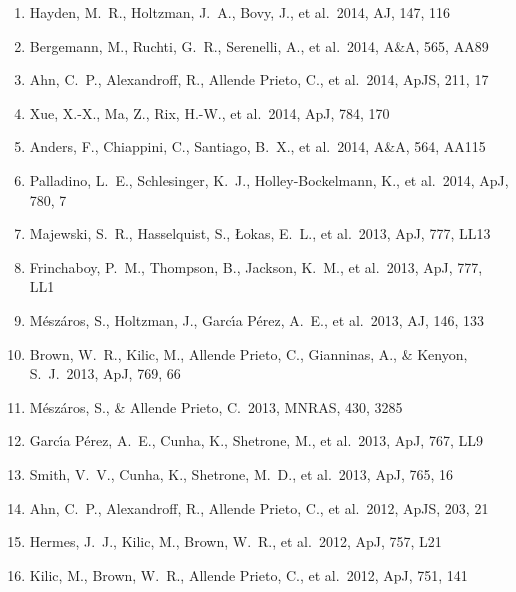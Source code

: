 \documentclass[12pt]{article}
\begin{document}
\begin{enumerate}
\item Hayden, M.~R., Holtzman, 
J.~A., Bovy, J., et al.\ 2014, AJ, 147, 116 


\item Bergemann, M., Ruchti, G.~R., Serenelli, A., et al.\ 2014, A\&A, 565, AA89 


\item Ahn, C.~P., Alexandroff, 
R., Allende Prieto, C., et al.\ 2014, ApJS, 211, 17 


\item Xue, X.-X., Ma, Z., Rix, 
H.-W., et al.\ 2014, ApJ, 784, 170 


\item Anders, F., Chiappini, C., Santiago, B.~X., et al.\ 2014, A\&A, 564, AA115 


\item Palladino, L.~E., 
Schlesinger, K.~J., Holley-Bockelmann, K., et al.\ 2014, ApJ, 780, 7 


\item Majewski, S.~R., 
Hasselquist, S., {\L}okas, E.~L., et al.\ 2013, ApJ, 777, LL13 


\item Frinchaboy, P.~M., 
Thompson, B., Jackson, K.~M., et al.\ 2013, ApJ, 777, LL1 


\item 
M{\'e}sz{\'a}ros, S., Holtzman, J., Garc{\'{\i}}a P{\'e}rez, A.~E., et al.\ 
2013, AJ, 146, 133 


\item Brown, W.~R., Kilic, M., 
Allende Prieto, C., Gianninas, A., \& Kenyon, S.~J.\ 2013, ApJ, 769, 66 


\item M{\'e}sz{\'a}ros, S., \& Allende Prieto, C.\ 2013, MNRAS, 430, 3285 


\item
Garc{\'{\i}}a P{\'e}rez, A.~E., Cunha, K., Shetrone, M., et al.\ 2013, 
ApJ, 767, LL9 


\item Smith, V.~V., Cunha, K., 
Shetrone, M.~D., et al.\ 2013, ApJ, 765, 16 


\item Ahn, C.~P., Alexandroff, 
R., Allende Prieto, C., et al.\ 2012, ApJS, 203, 21 


\item Hermes, J.~J., Kilic, 
M., Brown, W.~R., et al.\ 2012, ApJ, 757, L21 


\item Kilic, M., Brown, W.~R., 
Allende Prieto, C., et al.\ 2012, ApJ, 751, 141 



\end{enumerate}
\end{document}
